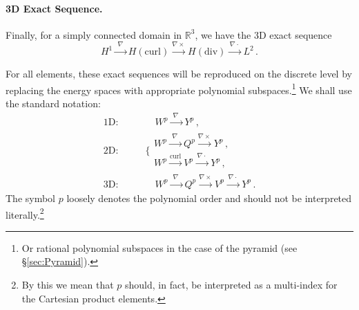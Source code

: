 \paragraph{3D Exact Sequence.} Finally, for a simply connected domain in $\mathbb{R}^3$, we have the 3D exact sequence
\begin{equation}
H^1 \xrightarrow{\,\,\nabla\,\,} H(\mathrm{curl}) \xrightarrow{\nabla\times} H(\mathrm{div}) \xrightarrow{\,\nabla\cdot\,} L^2 \, .
\label{eq:3D_exact_sequence}
\end{equation}

For all elements, these exact sequences will be reproduced on the discrete level by replacing the energy spaces with appropriate polynomial subspaces.\footnote{Or rational polynomial subspaces in the case of the pyramid (see \S\ref{sec:Pyramid}).} We shall use the standard notation:
\begin{equation}
\begin{aligned}
	\text{1D}:&\quad\qquad W^p \xrightarrow{\,\,\nabla\,\,\,}Y^p \, ,\\
	\text{2D}:&\qquad\!\!\Bigg\{\begin{array}{c}
		W^p \xrightarrow{\,\,\nabla\,\,\,} Q^p \xrightarrow{\nabla\times} Y^p  \, ,\\[4pt]
		W^p \xrightarrow{\mathrm{curl}} V^p \xrightarrow{\,\nabla\cdot\,} Y^p  \, ,\end{array}\\
	\text{3D}:&\quad\qquad W^p \xrightarrow{\,\,\nabla\,\,\,} Q^p \xrightarrow{\nabla\times} V^p \xrightarrow{\,\nabla\cdot\,} Y^p\,.
\end{aligned}
\label{eq:polynomial_exact_sequences}
\end{equation}
The symbol $p$ loosely denotes the polynomial order and should not be interpreted literally.\footnote{By this we mean that $p$ should, in fact, be interpreted as a multi-index for the Cartesian product elements.}

